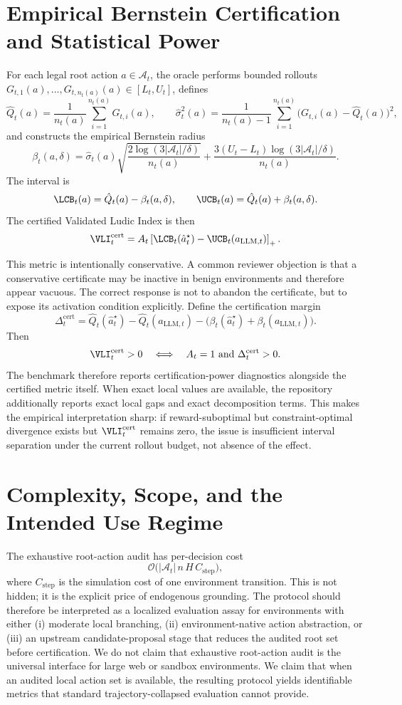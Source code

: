 \section{Empirical Bernstein Certification and Statistical Power}

For each legal root action $a\in\mathcal{A}_t$, the oracle performs bounded rollouts $G_{t,1}(a),\ldots,G_{t,n_t(a)}(a)\in[L_t,U_t]$, defines
$$
\hat Q_t(a)=\frac{1}{n_t(a)}\sum_{i=1}^{n_t(a)} G_{t,i}(a),
\qquad
\hat\sigma_t^2(a)=\frac{1}{n_t(a)-1}\sum_{i=1}^{n_t(a)}\bigl(G_{t,i}(a)-\hat Q_t(a)\bigr)^2,
$$
and constructs the empirical Bernstein radius
$$
\beta_t(a,\delta)
=
\hat\sigma_t(a)\sqrt{\frac{2\log(3|\mathcal{A}_t|/\delta)}{n_t(a)}}
+
\frac{3(U_t-L_t)\log(3|\mathcal{A}_t|/\delta)}{n_t(a)}.
$$
The interval is
$$
\LCB_t(a)=\hat Q_t(a)-\beta_t(a,\delta),
\qquad
\UCB_t(a)=\hat Q_t(a)+\beta_t(a,\delta).
$$
The certified Validated Ludic Index is then
$$
\VLI_t^{\mathrm{cert}}
=
A_t\left[\LCB_t(\hat a_t^{\star})-\UCB_t(a_{\mathrm{LLM},t})\right]_+.
$$

This metric is intentionally conservative. A common reviewer objection is that a conservative certificate may be inactive in benign environments and therefore appear vacuous. The correct response is not to abandon the certificate, but to expose its activation condition explicitly. Define the certification margin
$$
\Delta_t^{\mathrm{cert}}
=
\hat Q_t(\hat a_t^{\star})-\hat Q_t(a_{\mathrm{LLM},t})
-
\bigl(\beta_t(\hat a_t^{\star})+\beta_t(a_{\mathrm{LLM},t})\bigr).
$$
Then
$$
\VLI_t^{\mathrm{cert}} > 0
\quad\Longleftrightarrow\quad
A_t=1 \ \text{and}\ \Delta_t^{\mathrm{cert}} > 0.
$$
The benchmark therefore reports certification-power diagnostics alongside the certified metric itself. When exact local values are available, the repository additionally reports exact local gaps and exact decomposition terms. This makes the empirical interpretation sharp: if reward-suboptimal but constraint-optimal divergence exists but $\VLI_t^{\mathrm{cert}}$ remains zero, the issue is insufficient interval separation under the current rollout budget, not absence of the effect.

\section{Complexity, Scope, and the Intended Use Regime}

The exhaustive root-action audit has per-decision cost
$$
\mathcal{O}\bigl(|\mathcal{A}_t|\, n\, H\, C_{\mathrm{step}}\bigr),
$$
where $C_{\mathrm{step}}$ is the simulation cost of one environment transition. This is not hidden; it is the explicit price of endogenous grounding. The protocol should therefore be interpreted as a localized evaluation assay for environments with either (i) moderate local branching, (ii) environment-native action abstraction, or (iii) an upstream candidate-proposal stage that reduces the audited root set before certification. We do not claim that exhaustive root-action audit is the universal interface for large web or sandbox environments. We claim that when an audited local action set is available, the resulting protocol yields identifiable metrics that standard trajectory-collapsed evaluation cannot provide.

